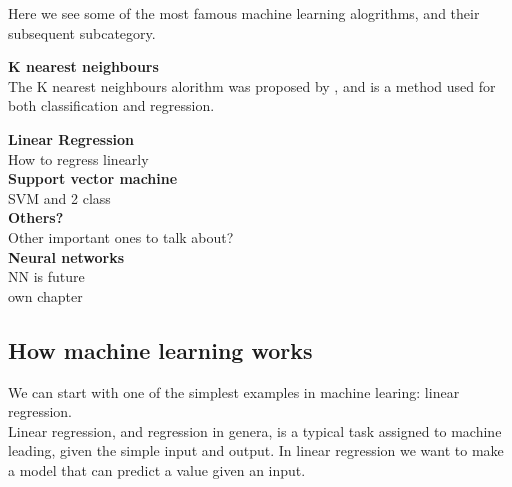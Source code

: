 	  
    Here we see some of the most famous machine learning alogrithms, and their subsequent subcategory. %
	  
	  \vspace{5px}
	  \textbf{K nearest neighbours}\\
	  The K nearest neighbours alorithm was proposed by%
	  , and is a method used for both classification and regression. 
	  
		
	  \vspace{5px}
	  \textbf{Linear Regression}\\
	  How to regress linearly\\
	  
	  \vspace{5px}
	  \textbf{Support vector machine}\\
	  SVM and 2 class\\
	  
	  \vspace{5px}
	  \textbf{Others?}\\
	  Other important ones to talk about?\\
	
	
	  \vspace{5px}
	  \textbf{Neural networks}\\
	  NN is future\\
	  own chapter\\
    
    
    \subsection{How machine learning works}   
	We can start with one of the simplest examples in machine learing: linear regression. \\
	Linear regression, and regression in genera, is a typical task assigned to machine leading, given the simple input and output. 
	In linear regression we want to make a model that can predict a value given an input.
	
